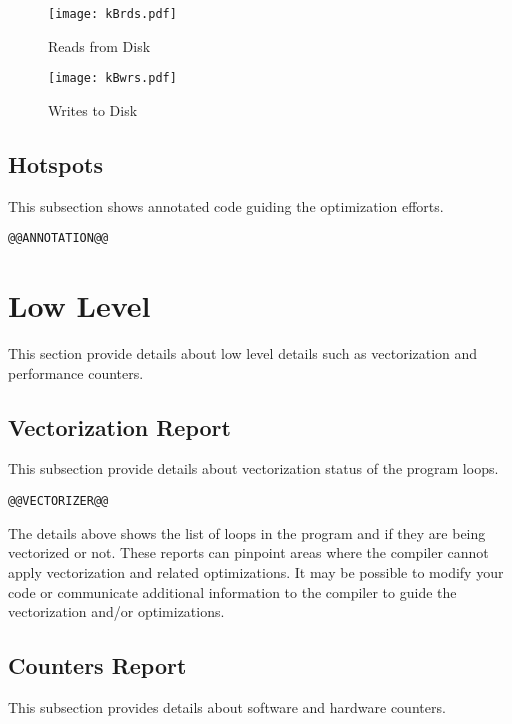 \documentclass[a4paper]{article}
\begin{document}
\begin{figure}[H]
\label{fig:reads}
\centering
\texttt{[image: kBrds.pdf]}
\caption{Reads from Disk}
\end{figure}

\begin{figure}[H]
\label{fig:writes}
\centering
\texttt{[image: kBwrs.pdf]}
\caption{Writes to Disk}
\end{figure}

\subsection{Hotspots}

This subsection shows annotated code guiding the optimization efforts.

\begin{verbatim}
@@ANNOTATION@@
\end{verbatim}

\section{Low Level}

This section provide details about low level details such as vectorization and performance counters.

\subsection{Vectorization Report}

This subsection provide details about vectorization status of the program loops.

\begin{verbatim}
@@VECTORIZER@@
\end{verbatim}

The details above shows the list of loops in the program and if they are being vectorized or not.
These reports can pinpoint areas where the compiler cannot apply vectorization and related optimizations.
It may be possible to modify your code or communicate additional information to the compiler to guide the vectorization and/or optimizations.

\subsection{Counters Report}

This subsection provides details about software and hardware counters.
\end{document}
